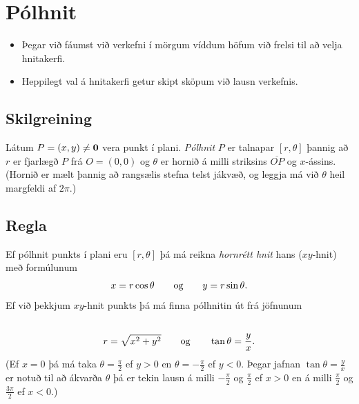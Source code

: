 \documentclass[a4paper,10pt,icelandic]{sphinxmanual}
\begin{document}
\section{Pólhnit}
\label{Kafli1:polhnit}\begin{itemize}
\item {} 
Þegar við fáumst við verkefni í mörgum víddum höfum við frelsi til að
velja hnitakerfi.

\item {} 
Heppilegt val á hnitakerfi getur skipt sköpum við lausn verkefnis.

\end{itemize}


\subsection{Skilgreining}
\label{Kafli1:index-9}\label{Kafli1:id8}
Látum \(P=(x,y)\neq \mbox{${\bf 0}$}\) vera punkt í plani. \textit{Pólhnit}
\(P\) er talnapar \([r,\theta]\) þannig að \(r\) er fjarlægð
\(P\) frá \(O=(0,0)\) og \(\theta\) er hornið á milli
striksins \(\overline{OP}\) og \(x\)-ássins. (Hornið er mælt
þannig að rangsælis stefna telst jákvæð, og leggja má við \(\theta\)
heil margfeldi af \(2\pi\).)


\subsection{Regla}
\label{Kafli1:id9}
Ef pólhnit punkts í plani eru \([r, \theta]\) þá má reikna
\textit{hornrétt hnit} hans (\(xy\)-hnit) með formúlunum
\begin{gather}
\begin{split}\displaystyle x=r\cos\theta \qquad\mbox{og}\qquad y=r\sin\theta.\end{split}\notag
\end{gather}
Ef við þekkjum \(xy\)-hnit punkts þá má finna pólhnitin út frá
jöfnunum
\begin{gather}
\begin{split}\displaystyle\end{split}\notag\\\begin{split}r=\sqrt{x^2+y^2}\qquad\mbox{og}
\qquad \tan\theta=\frac{y}{x}.\end{split}\notag
\end{gather}
(Ef \(x=0\) þá má taka \(\theta=\frac{\pi}{2}\) ef \(y>0\)
en \(\theta=-\frac{\pi}{2}\) ef \(y<0\). Þegar jafnan
\(\tan\theta=\frac{y}{x}\) er notuð til að ákvarða \(\theta\) þá
er tekin lausn á milli \(-\frac{\pi}{2}\) og \(\frac{\pi}{2}\)
ef \(x>0\) en á milli \(\frac{\pi}{2}\) og
\(\frac{3\pi}{2}\) ef \(x<0\).)
\end{document}
